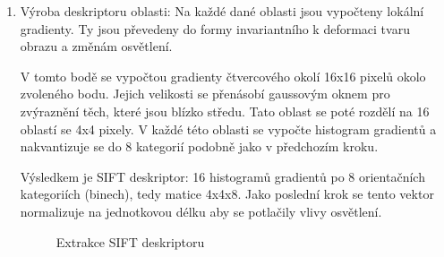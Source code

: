 \begin{enumerate}
		\item Výroba deskriptoru oblasti: Na každé dané oblasti jsou vypočteny lokální gradienty. Ty jsou převedeny do formy invariantního k deformaci tvaru obrazu a změnám osvětlení.
		
			V tomto bodě se vypočtou gradienty čtvercového okolí 16x16 pixelů okolo zvoleného bodu. Jejich velikosti se přenásobí gaussovým oknem pro zvýraznění těch, které jsou blízko středu. Tato oblast se poté rozdělí na 16 oblastí se 4x4 pixely. V každé této oblasti se vypočte histogram gradientů a nakvantizuje se do 8 kategorií podobně jako v předchozím kroku.
			
			Výsledkem je SIFT deskriptor: 16 histogramů gradientů po 8 orientačních kategoriích (binech), tedy matice 4x4x8. Jako poslední krok se tento vektor normalizuje na jednotkovou délku aby se potlačily vlivy osvětlení. 
			
			\begin{figure}[!ht] 
				\caption{Extrakce SIFT deskriptoru} 	\label{sift_kp}
			\end{figure}
			
	\end{enumerate}
	

